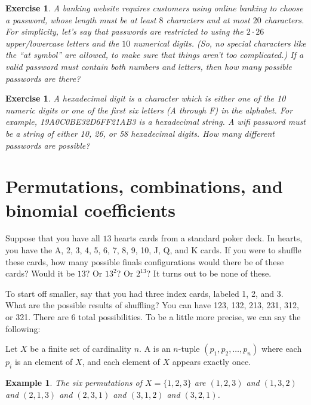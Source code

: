 \documentclass{book}
\newcounter{ekcounter}%
\theoremstyle{ekimcustom}
\newtheorem{example}[ekcounter]{Example}
\newtheorem{exercise}[ekcounter]{Exercise}
\newcommand\defn[1]{{\color{blue}{\bf #1}}}
\begin{document}
\begin{exercise}
A banking website requires customers using online banking to choose a password, whose length must be at least $8$ characters and at most $20$ characters. For simplicity, let's say that passwords are restricted to using the $2 \cdot 26$ upper/lowercase letters and the $10$ numerical digits. (So, no special characters like the ``at symbol'' are allowed, to make sure that things aren't too complicated.) If a valid password must contain both numbers and letters, then how many possible passwords are there?
\end{exercise}

\begin{exercise}
A hexadecimal digit is a character which is either one of the 10 numeric digits or one of the first six letters (A through F) in the alphabet. For example, 19A0C0BE32D6FF21AB3 is a hexadecimal string. A wifi password must be a string of either 10, 26, or 58 hexadecimal digits. How many different passwords are possible?%
\end{exercise}

\section{Permutations, combinations, and binomial coefficients}

Suppose that you have all $13$ hearts cards from a standard poker deck. In hearts, you have the A, 2, 3, 4, 5, 6, 7, 8, 9, 10, J, Q, and K cards. If you were to shuffle these cards, how many possible finals configurations would there be of these cards? Would it be $13$? Or $13^2$? Or $2^{13}$? It turns out to be none of these.

To start off smaller, say that you had three index cards, labeled 1, 2, and 3. What are the possible results of shuffling? You can have 123, 132, 213, 231, 312, or 321. There are $6$ total possibilities. To be a little more precise, we can say the following:
\begin{bdefinition}{}{}
Let $X$ be a finite set of cardinality $n$. A \defn{permutation} is an $n$-tuple $(p_1,p_2,\dots,p_n)$ where each $p_i$ is an element of $X$, and each element of $X$ appears exactly once.
\end{bdefinition}
\begin{example}
The six permutations of $X=\{1,2,3\}$ are $(1,2,3)$ and $(1,3,2)$ and $(2,1,3)$ and $(2,3,1)$ and $(3,1,2)$ and $(3,2,1)$.
\end{example}
\end{document}
